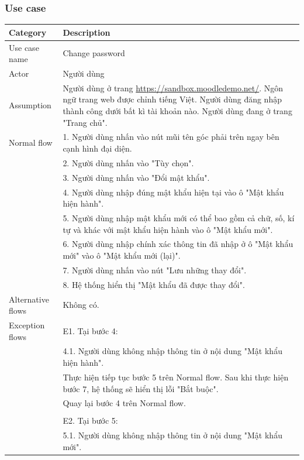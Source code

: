 \documentclass[a4paper, 12pt]{article}
\begin{document}
\subsubsection{Use case}
\begin{table}[H]
    \centering
    \begin{tabular}{|l|p{11cm}|}
        \hline
        Category & Description \\
        \hline
        Use case name & Change password \\
        \hline
        Actor & Người dùng \\
        \hline
        Assumption & Người dùng ở trang \url{https://sandbox.moodledemo.net/}. Ngôn ngữ trang web được chỉnh tiếng Việt. Người dùng đăng nhập thành công dưới bất kì tài khoản nào. Người dùng đang ở trang "Trang chủ". \\
        \hline
        Normal flow & 1. Người dùng nhấn vào nút mũi tên góc phải trên ngay bên cạnh hình đại diện. \\
        & 2. Người dùng nhấn vào "Tùy chọn". \\
        & 3. Người dùng nhấn vào "Đổi mật khẩu". \\
        & 4. Người dùng nhập đúng mật khẩu hiện tại vào ô "Mật khẩu hiện hành".\\
        & 5. Người dùng nhập mật khẩu mới có thể bao gồm cả chữ, số, kí tự và khác với mật khẩu hiện hành vào ô "Mật khẩu mới".\\
        & 6. Người dùng nhập chính xác thông tin đã nhập ở ô "Mật khẩu mới" vào ô "Mật khẩu mới (lại)".\\
        & 7. Người dùng nhấn vào nút "Lưu những thay đổi". \\
        & 8. Hệ thống hiển thị "Mật khẩu đã được thay đổi". \\
        \hline
        Alternative flows & Không có. \\
        \hline
        Exception flows & E1. Tại bước 4: \\
        & 4.1. Người dùng không nhập thông tin ở nội dung "Mật khẩu hiện hành". \\ 
        & Thực hiện tiếp tục bước 5 trên Normal flow. Sau khi thực hiện bước 7, hệ thống sẽ hiển thị lỗi "Bắt buộc". \\
        & Quay lại bước 4 trên Normal flow. \\
        & \\
        & E2. Tại bước 5: \\
        & 5.1. Người dùng không nhập thông tin ở nội dung "Mật khẩu mới". \\

\end{tabular}
\end{table}
\end{document}
